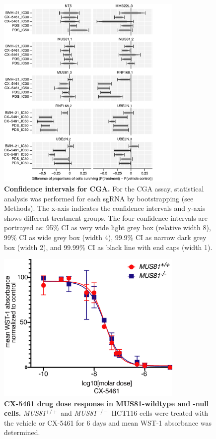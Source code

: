 \clearpage

\begin{figure}
    \centering
    \includegraphics[width=0.8\textwidth]{supplement/figures/validation_bootstrap.png}
    \caption[CGA with confidence intervals]
            {\small{\textbf{Confidence intervals for CGA.}}
            For the CGA assay, statistical analysis was performed for each sgRNA by bootstrapping (see Methods). The x-axis indicates the confidence intervals and y-axis shows different treatment groups. The four confidence intervals are portrayed as: 95\% CI as very wide light grey box (relative width 8), 99\% CI as wide grey box (width 4), 99.9\% CI as narrow dark grey box (width 2), and 99.99\% CI as black line with end caps (width 1).
            }
        \label{sfig:validationCI}
\end{figure}

\begin{figure}
    \centering
    \includegraphics[width=0.8\textwidth]{supplement/figures/Mus81_cells.png}
    \caption[CX-5461 drug dose response in HCT116 MUS81-wildtype and -null cells]
            {\small{\textbf{CX-5461 drug dose response in MUS81-wildtype and -null cells.}}
            \textit{MUS81$^{+/+}$} and \textit{MUS81$^{-/-}$} HCT116 cells were treated with the vehicle or CX-5461 for 6 days and mean WST-1 absorbance was determined. 
            }
        \label{sfig:mus81cells}
\end{figure}

